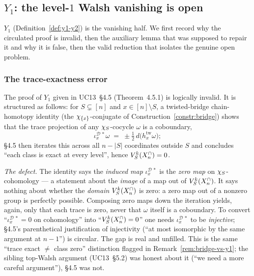 \subsection{$Y_1$: the level-$1$ Walsh vanishing is open}
\label{ssec:y1}

$Y_1$ (Definition~\ref{def:y1-y2}) is the vanishing half. We first
record why the circulated proof is invalid, then the auxiliary lemma
that was supposed to repair it and why it is false, then the valid
reduction that isolates the genuine open problem.

\subsubsection{The trace-exactness error}

\begin{correction}
\label{corr:trace-exact}
The proof of $Y_1$ given in UC13~\S4.5 (Theorem~4.5.1) is logically
invalid. It is structured as follows: for $S\subsetneq[n]$ and
$x\in[n]\setminus S$, a twisted-bridge chain-homotopy identity (the
$\chi_{\{x\}}$-conjugate of Construction~\ref{constr:bridge}) shows
that the trace projection of any $\chi_{S}$-cocycle $\omega$ is a
coboundary,
\[
  \iota_x^{\mathcal D\,*}\omega
  \;=\;\pm\tfrac12\,d\bigl(h_x^{\mathrm{tw}}\omega\bigr);
\]
\S4.5 then iterates this across all $n-|S|$ coordinates outside $S$ and
concludes ``each class is exact at every level'', hence
$V_{S}^{k}(X^{\cap}_n)=0$.

\emph{The defect.} The identity says the \emph{induced map}
$\iota_x^{\mathcal D\,*}$ is the \emph{zero map} on
$\chi_{S}$-cohomology --- a statement about the \emph{image} of a map
out of $V_{S}^{k}(X^{\cap}_n)$. It says nothing about whether the
\emph{domain} $V_{S}^{k}(X^{\cap}_n)$ is zero: a zero map out of a nonzero
group is perfectly possible. Composing zero maps down the iteration
yields, again, only that each trace is zero, never that $\omega$
itself is a coboundary. To convert ``$\iota_x^{\mathcal D\,*}=0$ on
cohomology'' into ``$V_{S}^{k}(X^{\cap}_n)=0$'' one needs
$\iota_x^{\mathcal D\,*}$ to be \emph{injective}; \S4.5's parenthetical
justification of injectivity (``at most isomorphic by the same argument
at $n-1$'') is circular. The gap is real and unfilled. This is the
same ``trace exact $\neq$ class zero'' distinction flagged in
Remark~\ref{rem:bridge-vs-y1}; the sibling top-Walsh argument
(UC13~\S5.2) was honest about it (``we need a more careful argument''),
\S4.5 was not.
\end{correction}

